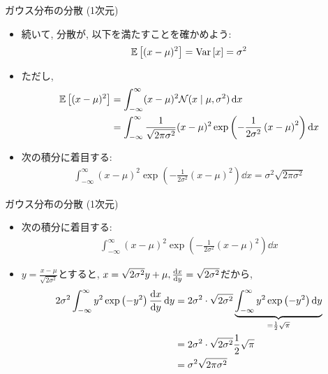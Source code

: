 \documentclass[dvipdfmx,notheorems,t]{beamer}
\begin{document}
\begin{frame}{ガウス分布の分散 (1次元)}
\begin{itemize}
  \item 続いて, 分散が, 以下を満たすことを確かめよう:
  \begin{align*}
    \operatorname{\mathbb{E}} \left[ (x - \mu)^2 \right] = \operatorname{Var} \left[ x \right] = \sigma^2
  \end{align*}
  \item ただし,
  \begin{align*}
    \operatorname{\mathbb{E}} \left[ (x - \mu)^2 \right] &= \int_{-\infty}^\infty (x - \mu)^2 \mathcal{N}(x \mid \mu, \sigma^2) \dd{x} \\
      &= \int_{-\infty}^\infty \frac{1}{\sqrt{2 \pi \sigma^2}} (x - \mu)^2
        \exp \left( -\frac{1}{2 \sigma^2} \left( x - \mu \right)^2 \right) \dd{x}
  \end{align*}
  \item 次の積分に着目する:
  \begin{align*}
    \int_{-\infty}^\infty (x - \mu)^2
      \exp \left( -\frac{1}{2 \sigma^2} \left( x - \mu \right)^2 \right) \dd{x}
      = \sigma^2 \sqrt{2 \pi \sigma^2}
  \end{align*}
\end{itemize}
\end{frame}

\begin{frame}{ガウス分布の分散 (1次元)}
\begin{itemize}
  \item 次の積分に着目する:
  \begin{align*}
    \int_{-\infty}^\infty (x - \mu)^2
      \exp \left( -\frac{1}{2 \sigma^2} \left( x - \mu \right)^2 \right) \dd{x}
  \end{align*}
  \item $y = \frac{x - \mu}{\sqrt{2 \sigma^2}}$とすると,
  $x = \sqrt{2 \sigma^2} y + \mu, \dv{x}{y} = \sqrt{2 \sigma^2}$だから,
  \begin{align*}
    2 \sigma^2 \int_{-\infty}^\infty y^2 \exp \left( -y^2 \right) \dv{x}{y} \dd{y}
      &= 2 \sigma^2 \cdot \sqrt{2 \sigma^2}
        \underbrace{\int_{-\infty}^\infty y^2 \exp \left( -y^2 \right) \dd{y}}_{= \frac{1}{2} \sqrt{\pi}} \\
      &= 2 \sigma^2 \cdot \sqrt{2 \sigma^2} \frac{1}{2} \sqrt{\pi} \\
      &= \sigma^2 \sqrt{2 \pi \sigma^2}
  \end{align*}
\end{itemize}
\end{frame}
\end{document}

